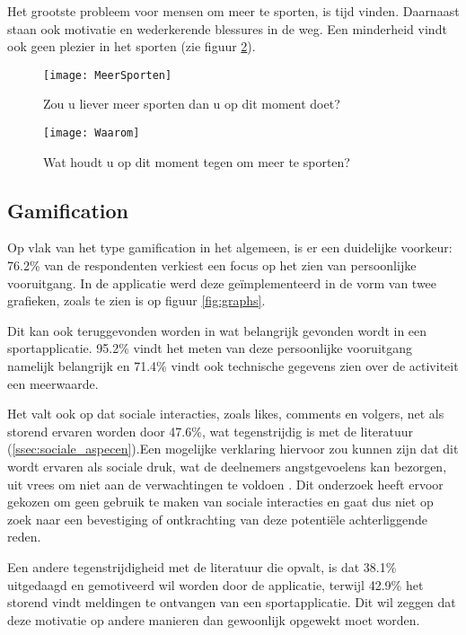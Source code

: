 Het grootste probleem voor mensen om meer te sporten, is tijd vinden. Daarnaast staan ook motivatie en wederkerende blessures in de weg. Een minderheid vindt ook geen plezier in het sporten (zie figuur \ref{fig:waarom}).

\begin{figure}[h]
    \caption[Zou u liever meer sporten dan u op dit moment doet?]{Zou u liever meer sporten dan u op dit moment doet?}
    \texttt{[image: MeerSporten]}
    \label{fig:meerBewegen}
\end{figure}

\begin{figure}[h]
    \caption[Wat houdt u op dit moment tegen om meer te sporten?]{Wat houdt u op dit moment tegen om meer te sporten?}
    \texttt{[image: Waarom]}
    \label{fig:waarom}
\end{figure}

\subsection{Gamification}

Op vlak van het type gamification in het algemeen, is er een duidelijke voorkeur: 76.2\% van de respondenten verkiest een focus op het zien van persoonlijke vooruitgang. In de applicatie werd deze geïmplementeerd in de vorm van twee grafieken, zoals te zien is op figuur \ref{fig:graphs}.

Dit kan ook teruggevonden worden in wat belangrijk gevonden wordt in een sportapplicatie. 95.2\% vindt het meten van deze persoonlijke vooruitgang namelijk belangrijk en 71.4\% vindt ook technische gegevens zien over de activiteit een meerwaarde.

Het valt ook op dat sociale interacties, zoals likes, comments en volgers, net als storend ervaren worden door 47.6\%, wat tegenstrijdig is met de literatuur (\ref{ssec:sociale_aspecen}).Een mogelijke verklaring hiervoor zou kunnen zijn dat dit wordt ervaren als sociale druk, wat de deelnemers angstgevoelens kan bezorgen, uit vrees om niet aan de verwachtingen te voldoen \autocite{Jong2010}. Dit onderzoek heeft ervoor gekozen om geen gebruik te maken van sociale interacties en gaat dus niet op zoek naar een bevestiging of ontkrachting van deze potentiële achterliggende reden.

Een andere tegenstrijdigheid met de literatuur die opvalt, is dat 38.1\% uitgedaagd en gemotiveerd wil worden door de applicatie, terwijl 42.9\% het storend vindt meldingen te ontvangen van een sportapplicatie. Dit wil zeggen dat deze motivatie op andere manieren dan gewoonlijk opgewekt moet worden.

